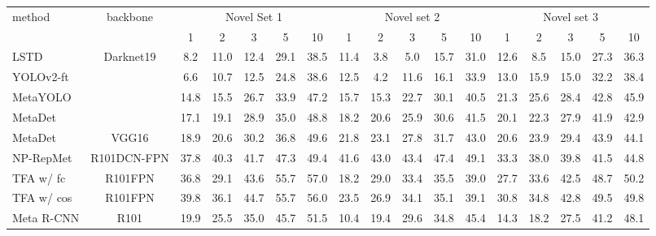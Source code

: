 \documentclass[10pt,twocolumn,letterpaper]{article}
\begin{document}
\begin{table*}
\begin{center}
\setlength\tabcolsep{1.8pt}
\begin{tabular}{|l|c|| c|c|c|c|c|| c|c|c|c|c|| c|c|c|c|c|}
\hline
\multirow{2}{*}{method} & \multirow{2}{*}{backbone} & \multicolumn{5}{c|}{Novel Set 1} & \multicolumn{5}{c|}{Novel set 2} & \multicolumn{5}{c|}{Novel set 3} \\ \cline{3-17} 
  &  &  1 & 2 & 3 & 5 & 10 & 1 & 2 & 3 & 5 & 10 & 1 & 2 & 3 & 5 & 10 \\
\hline\hline
    LSTD   \cite{chen2018lstd}     & \multirow{4}{*}{Darknet19 } & 8.2 & 11.0 & 12.4 & 29.1 & 38.5 & 11.4 & 3.8 & 5.0 & 15.7 & 31.0 & 12.6 & 8.5 & 15.0 & 27.3 & 36.3 \\    
    YOLOv2-ft \cite{kang2019few}  &  & 6.6 & 10.7 & 12.5 & 24.8 & 38.6 & 12.5 & 4.2 & 11.6 & 16.1 & 33.9 & 13.0 & 15.9 & 15.0 & 32.2 & 38.4 \\    
    MetaYOLO  \cite{kang2019few}  &  &14.8 & 15.5 & 26.7 & 33.9 & 47.2 & 15.7 &15.3 &22.7 &30.1 &40.5 &21.3 &25.6 &28.4&42.8 &45.9 \\    
    MetaDet  \cite{wang2019meta}   &  &17.1 & 19.1 & 28.9 & 35.0 & 48.8 & 18.2 &20.6 &25.9 &30.6 &41.5 &20.1 &22.3 &27.9& 41.9 &42.9 \\ \hline
    MetaDet  \cite{wang2019meta}    & VGG16 \cite{simonyan2014very} &18.9 & 20.6 & 30.2 & 36.8 & 49.6 & 21.8 &23.1 &27.8 &31.7 &43.0 &20.6 & 23.9 & 29.4 & 43.9 &44.1 \\
NP-RepMet \cite{yang2020restoring}     & R101DCN-FPN    & 37.8 & 40.3 & 41.7 & 47.3 & 49.4 & 41.6 & 43.0 & 43.4 & 47.4 & 49.1 & 33.3 & 38.0 & 39.8 & 41.5  & 44.8 \\
    TFA w/ fc  \cite{wang2020frustratingly} & R101FPN     & 36.8 & 29.1 & 43.6 & 55.7 & 57.0 & 18.2 & 29.0 & 33.4 & 35.5 & 39.0 & 27.7 & 33.6 & 42.5 &  48.7 & 50.2\\
    TFA w/ cos  \cite{wang2020frustratingly} & R101FPN     & 39.8 & 36.1 & 44.7 & 55.7 & 56.0 & 23.5 & 26.9 & 34.1 & 35.1 & 39.1 & 30.8 & 34.8 & 42.8 &  49.5 & 49.8\\
Meta R-CNN \cite{yan2019meta}     & R101      &19.9 & 25.5 & 35.0 & 45.7 & 51.5 & 10.4 &19.4 &29.6 &34.8 &45.4 &14.3 &18.2 &27.5&41.2 &48.1 \\
    

\end{tabular}
\end{center}
\end{table*}
\end{document}
